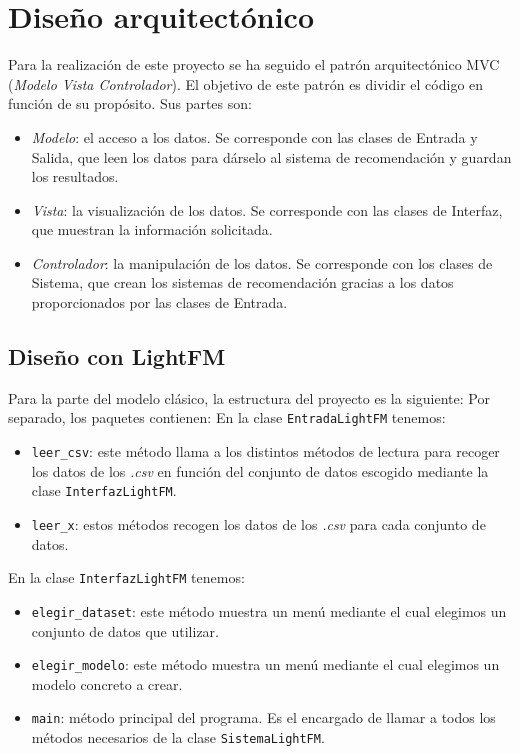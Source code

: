 \section{Diseño arquitectónico}
Para la realización de este proyecto se ha seguido el patrón arquitectónico MVC (\textit{Modelo Vista Controlador}). El objetivo de este patrón es dividir el código en función de su propósito. Sus partes son:
\begin{itemize}
\tightlist
\item \textit{Modelo}: el acceso a los datos. Se corresponde con las clases de Entrada y Salida, que leen los datos para dárselo al sistema de recomendación y guardan los resultados.
\item \textit{Vista}: la visualización de los datos. Se corresponde con las clases de Interfaz, que muestran la información solicitada.
\item \textit{Controlador}: la manipulación de los datos. Se corresponde con los clases de Sistema, que crean los sistemas de recomendación gracias a los datos proporcionados por las clases de Entrada.
\end{itemize}


\subsection{Diseño con LightFM}\label{diseño-lightfm}
Para la parte del modelo clásico, la estructura del proyecto es la siguiente:
Por separado, los paquetes contienen:
En la clase \texttt{EntradaLightFM} tenemos:
\begin{itemize}
\tightlist
\item \texttt{leer\_csv}: este método llama a los distintos métodos de lectura para recoger los datos de los \textit{.csv} en función del conjunto de datos escogido mediante la clase \texttt{InterfazLightFM}.
\item \texttt{leer\_x}: estos métodos recogen los datos de los \textit{.csv} para cada conjunto de datos.
\end{itemize}

En la clase \texttt{InterfazLightFM} tenemos:
\begin{itemize}
\tightlist
\item \texttt{elegir\_dataset}: este método muestra un menú mediante el cual elegimos un conjunto de datos que utilizar.
\item \texttt{elegir\_modelo}: este método muestra un menú mediante el cual elegimos un modelo concreto a crear. 
\item \texttt{main}: método principal del programa. Es el encargado de llamar a todos los métodos necesarios de la clase \texttt{SistemaLightFM}. 
\end{itemize}

